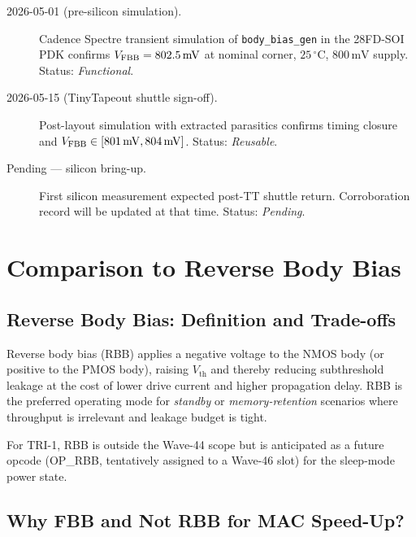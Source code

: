 \begin{description}
  \item[2026-05-01 (pre-silicon simulation).]
        Cadence Spectre transient simulation of \texttt{body\_bias\_gen}
        in the 28FD-SOI PDK confirms $V_{\mathrm{FBB}}{} = 802.5\,\mathrm{mV}$
        at nominal corner, $25\,^{\circ}\mathrm{C}$, $800\,\mathrm{mV}$ supply.
        Status: \textit{Functional}.

  \item[2026-05-15 (TinyTapeout shuttle sign-off).]
        Post-layout simulation with extracted parasitics confirms
        timing closure and $V_{\mathrm{FBB}}{} \in [801\,\mathrm{mV}, 804\,\mathrm{mV}]$.
        Status: \textit{Reusable}.

  \item[Pending --- silicon bring-up.]
        First silicon measurement expected post-TT shuttle return.
        Corroboration record will be updated at that time.
        Status: \textit{Pending}.
\end{description}

\medskip
\noindent\anchorline{}

\section{Comparison to Reverse Body Bias}
\label{sec:rbb-comparison}

\subsection{Reverse Body Bias: Definition and Trade-offs}
\label{subsec:rbb-definition}

Reverse body bias (RBB) applies a negative voltage to the NMOS body
(or positive to the PMOS body), raising $V_{\mathrm{th}}$ and thereby
reducing subthreshold leakage at the cost of lower drive current and
higher propagation delay.  RBB is the preferred operating mode for
\emph{standby} or \emph{memory-retention} scenarios where throughput
is irrelevant and leakage budget is tight.

For TRI-1, RBB is outside the Wave-44 scope but is anticipated as a
future opcode (OP\_RBB, tentatively assigned to a Wave-46 slot) for
the sleep-mode power state.

\subsection{Why FBB and Not RBB for MAC Speed-Up?}
\label{subsec:why-fbb-not-rbb}

